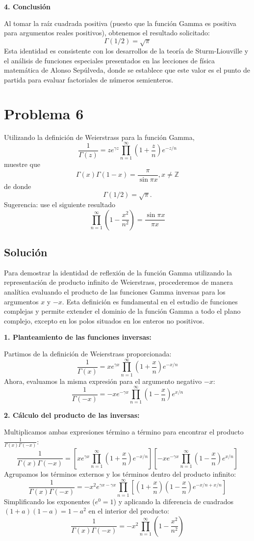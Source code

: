 \documentclass[a4paper]{article}
\begin{document}
\textbf{4. Conclusión}

Al tomar la raíz cuadrada positiva (puesto que la función Gamma es positiva para argumentos reales positivos), obtenemos el resultado solicitado:
$$ \Gamma(1/2) = \sqrt{\pi} $$
Esta identidad es consistente con los desarrollos de la teoría de Sturm-Liouville y el análisis de funciones especiales presentados en las lecciones de física matemática de Alonso Sepúlveda, donde se establece que este valor es el punto de partida para evaluar factoriales de números semienteros.


\section{Problema 6}
Utilizando la definición de Weierstrass para la función Gamma,
$$ \frac{1}{\Gamma(z)} = z e^{\gamma z} \prod_{n=1}^{\infty} \left( 1 + \frac{z}{n} \right) e^{-z/n} $$
muestre que $$ \Gamma(x)\Gamma(1-x) = \frac{\pi}{\sin \pi x} , x \neq \mathbb{Z} $$
de donde $$ \Gamma(1/2) = \sqrt{\pi} .$$ Sugerencia: use el siguiente resultado $$ \prod_{n=1}^{\infty} \left( 1 - \frac{x^2}{n^2} \right) = \frac{\sin \pi x}{\pi x} $$

\subsection{Solución}

Para demostrar la identidad de reflexión de la función Gamma utilizando la representación de producto infinito de Weierstrass, procederemos de manera analítica evaluando el producto de las funciones Gamma inversas para los argumentos $x$ y $-x.$ Esta definición es fundamental en el estudio de funciones complejas y permite extender el dominio de la función Gamma a todo el plano complejo, excepto en los polos situados en los enteros no positivos.

\textbf{1. Planteamiento de las funciones inversas:}

Partimos de la definición de Weierstrass proporcionada:
$$ \frac{1}{\Gamma(x)} = x e^{\gamma x} \prod_{n=1}^{\infty} \left( 1 + \frac{x}{n} \right) e^{-x/n} $$
Ahora, evaluamos la misma expresión para el argumento negativo $-x$:
$$ \frac{1}{\Gamma(-x)} = -x e^{-\gamma x} \prod_{n=1}^{\infty} \left( 1 - \frac{x}{n} \right) e^{x/n} $$

\textbf{2. Cálculo del producto de las inversas:}

Multiplicamos ambas expresiones término a término para encontrar el producto $\frac{1}{\Gamma(x) \Gamma(-x)}$:
$$ \frac{1}{\Gamma(x) \Gamma(-x)} = \left[ x e^{\gamma x} \prod_{n=1}^{\infty} \left( 1 + \frac{x}{n} \right) e^{-x/n} \right] \left[ -x e^{-\gamma x} \prod_{n=1}^{\infty} \left( 1 - \frac{x}{n} \right) e^{x/n} \right] $$
Agrupamos los términos externos y los términos dentro del producto infinito:
$$ \frac{1}{\Gamma(x) \Gamma(-x)} = -x^2 e^{\gamma x - \gamma x} \prod_{n=1}^{\infty} \left[ \left( 1 + \frac{x}{n} \right) \left( 1 - \frac{x}{n} \right) e^{-x/n + x/n} \right] $$
Simplificando los exponentes ($e^0 = 1$) y aplicando la diferencia de cuadrados $(1 + a)(1 - a) = 1 - a^2$ en el interior del producto:
$$ \frac{1}{\Gamma(x) \Gamma(-x)} = -x^2 \prod_{n=1}^{\infty} \left( 1 - \frac{x^2}{n^2} \right) $$
\end{document}
